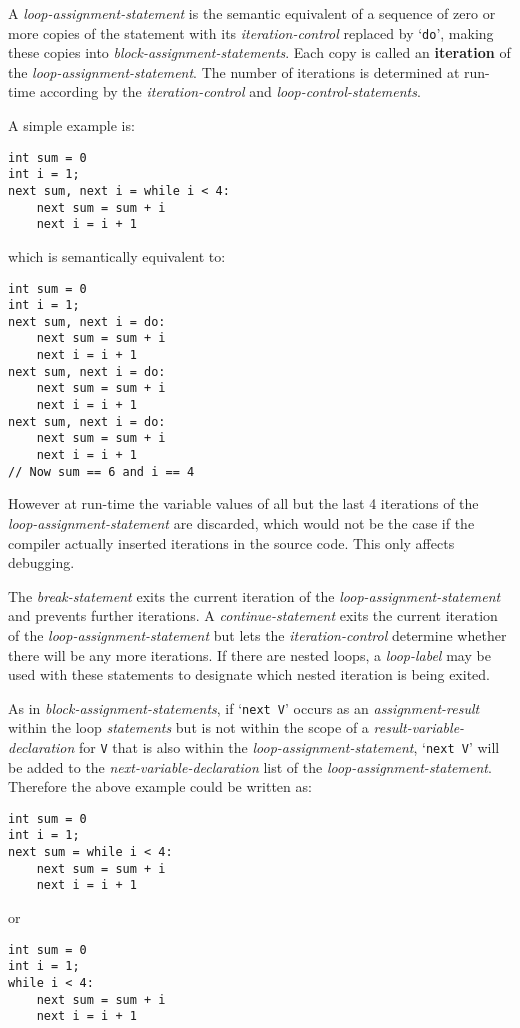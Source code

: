 \documentclass[12pt]{article}
\newcommand{\key}[1]{{\rm \bfseries #1}}
\newenvironment{indpar}[1][0.3in]%
	{\begin{list}{}%
		     {\setlength{\itemsep}{0in}%
		      \setlength{\topsep}{0in}%
		      \setlength{\parsep}{1ex}%
		      \setlength{\labelwidth}{#1}%
		      \setlength{\leftmargin}{#1}%
		      \addtolength{\leftmargin}{\labelsep}}%
	 \item}%
	{\end{list}}
\begin{document}
A {\em loop-assignment-statement} is the semantic equivalent of
a sequence of zero or more copies of the statement with
its {\em iteration-control} replaced by `{\tt do}', making these copies into
{\em block-assignment-statements}.  Each copy is called an
\key{iteration} of the {\em loop-assignment-statement}.
The number of iterations is
determined at run-time according by the {\em iteration-control}
and {\em loop-control-statements}.

A simple example is:
\begin{indpar}\begin{verbatim}
int sum = 0
int i = 1;
next sum, next i = while i < 4:
    next sum = sum + i
    next i = i + 1
\end{verbatim}\end{indpar}
which is semantically equivalent to:
\begin{indpar}\begin{verbatim}
int sum = 0
int i = 1;
next sum, next i = do:
    next sum = sum + i
    next i = i + 1
next sum, next i = do:
    next sum = sum + i
    next i = i + 1
next sum, next i = do:
    next sum = sum + i
    next i = i + 1
// Now sum == 6 and i == 4
\end{verbatim}\end{indpar}

However at run-time the variable values of all but the
last 4 iterations of the {\em loop-assignment-statement}
are discarded, which would not be the case if the compiler
actually inserted iterations in the source code. 
This only affects debugging.

The {\em break-statement} exits the current iteration of the
{\em loop-assignment-statement} and prevents further iterations.
A {\em continue-statement} exits the current iteration of the
{\em loop-assignment-statement} but lets the
{\em iteration-control} determine whether there will be any
more iterations.  If there are nested loops, a {\em loop-label}
may be used with these statements to designate which nested iteration
is being exited.

\label{LOOP-NEXT-PROMOTION}
As in {\em block-assignment-statements}, if `{\tt next V}' occurs
as an {\em assignment-result} within the loop {\em statements}
but is not within the scope of a {\em result-variable-declaration}
for {\tt V} that is also within the {\em loop-assignment-statement},
`{\tt next V}' will be added to the {\em next-variable-declaration}
list of the {\em loop-assignment-statement}.  Therefore the
above example could be written as:
\begin{indpar}\begin{verbatim}
int sum = 0
int i = 1;
next sum = while i < 4:
    next sum = sum + i
    next i = i + 1
\end{verbatim}\end{indpar}
or
\begin{indpar}\begin{verbatim}
int sum = 0
int i = 1;
while i < 4:
    next sum = sum + i
    next i = i + 1
\end{verbatim}\end{indpar}
\end{document}
